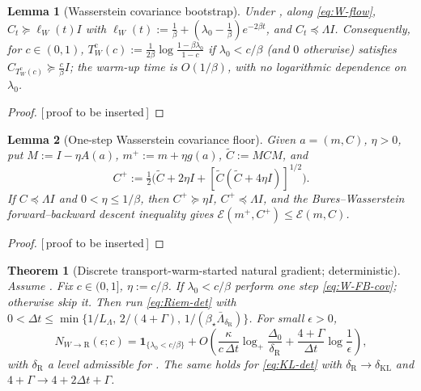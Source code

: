 \documentclass[11pt]{article}
\theoremstyle{plain}
\newtheorem{theorem}{Theorem}[section]
\newtheorem{lemma}[lemma]{Lemma}
\theoremstyle{definition}
\theoremstyle{remark}
\newcommand{\KL}{\mathrm{KL}}
\newcommand{\Id}{I}
\newcommand{\Riem}{\mathrm{R}}
\newcommand{\calE}{\mathcal{E}}
\newcommand{\logp}{\log_+}
\newcommand{\LB}{L_\Lambda}
\newcommand{\PROOFHOLE}{{\color{red}\textsf{[\,proof to be inserted\,]}}}
\begin{document}
\begin{lemma}[Wasserstein covariance bootstrap]
\label{lem:W-cov-bootstrap}
Under , along \eqref{eq:W-flow},
$C_t\succeq\ell_W(t)\Id$ with $\ell_W(t):=\tfrac1\beta+(\lambda_0-\tfrac1\beta)e^{-2\beta t}$, and
$C_t\preceq\Lambda\Id$. Consequently, for $c\in(0,1)$,
$T_W^{\mathrm c}(c):=\tfrac1{2\beta}\log\tfrac{1-\beta\lambda_0}{1-c}$ if $\lambda_0<c/\beta$ (and $0$
otherwise) satisfies $C_{T_W^{\mathrm c}(c)}\succeq\tfrac c\beta\Id$; the warm-up time is $O(1/\beta)$,
with no logarithmic dependence on $\lambda_0$.
\end{lemma}

\begin{proof}
\PROOFHOLE
\end{proof}

\begin{lemma}[One-step Wasserstein covariance floor]
\label{lem:one-step-W}
Given $a=(m,C)$, $\eta>0$, put $M:=\Id-\eta A(a)$, $m^+:=m+\eta g(a)$, $\widetilde C:=MCM$, and
\begin{equation}
\label{eq:W-FB-cov}
    C^+:=\tfrac12\bigl(\widetilde C+2\eta\Id+[\widetilde C(\widetilde C+4\eta\Id)]^{1/2}\bigr).
\end{equation}
If $C\preceq\Lambda\Id$ and $0<\eta\leq1/\beta$, then $C^+\succeq\eta\Id$, $C^+\preceq\Lambda\Id$, and
the Bures--Wasserstein forward--backward descent inequality gives $\calE(m^+,C^+)\leq\calE(m,C)$.
\end{lemma}

\begin{proof}
\PROOFHOLE
\end{proof}

\begin{theorem}[Discrete transport-warm-started natural gradient; deterministic]
\label{thm:disc-W-to-FR}
Assume . Fix $c\in(0,1]$, $\eta:=c/\beta$. If $\lambda_0<c/\beta$
perform one step \eqref{eq:W-FB-cov}; otherwise skip it. Then run \eqref{eq:Riem-det} with
$0<\Delta t\leq\min\{1/\LB,\,2/(4+\Gamma),\,1/(\beta_\star\bar\Lambda_{\delta_{\Riem}})\}$. For small
$\epsilon>0$,
\[
    \boxed{
    N_{W\to\Riem}(\epsilon;c)
    =\mathbf 1_{\{\lambda_0<c/\beta\}}
    +O\!\left(\frac\kappa{c\,\Delta t}\logp\frac{\Delta_0}{\delta_{\Riem}}+\frac{4+\Gamma}{\Delta t}\log\frac1\epsilon\right),
    }
\]
with $\delta_{\Riem}$ a level admissible for . The same holds for
\eqref{eq:KL-det} with $\delta_{\Riem}\to\delta_{\KL}$ and $4+\Gamma\to4+2\Delta t+\Gamma$.
\end{theorem}
\end{document}
